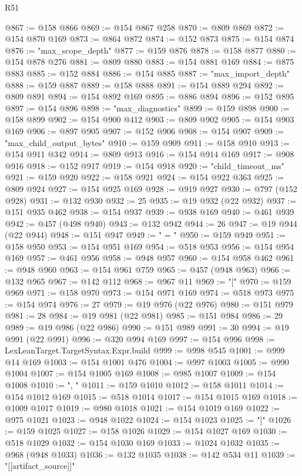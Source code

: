\begin{lexlean}{R51}
\begin{coremodule}
@867 := @158 @866
@869 := @154 @867 @258
@870 := @809 @869
@872 := @154 @870 @169
@873 := @864 @872
@874 := @152 @873
@875 := @154 @874
@876 := "max_scope_depth"
@877 := @159 @876
@878 := @158 @877
@880 := @154 @878 @276
@881 := @809 @880
@883 := @154 @881 @169
@884 := @875 @883
@885 := @152 @884
@886 := @154 @885
@887 := "max_import_depth"
@888 := @159 @887
@889 := @158 @888
@891 := @154 @889 @294
@892 := @809 @891
@894 := @154 @892 @169
@895 := @886 @894
@896 := @152 @895
@897 := @154 @896
@898 := "max_diagnostics"
@899 := @159 @898
@900 := @158 @899
@902 := @154 @900 @412
@903 := @809 @902
@905 := @154 @903 @169
@906 := @897 @905
@907 := @152 @906
@908 := @154 @907
@909 := "max_child_output_bytes"
@910 := @159 @909
@911 := @158 @910
@913 := @154 @911 @342
@914 := @809 @913
@916 := @154 @914 @169
@917 := @908 @916
@918 := @152 @917
@919 := @154 @918
@920 := "child_timeout_ms"
@921 := @159 @920
@922 := @158 @921
@924 := @154 @922 @363
@925 := @809 @924
@927 := @154 @925 @169
@928 := @919 @927
@930 := @797 (@152 @928)
@931 := @132 @930
@932 := 25
@935 := @19 @932 (@22 @932)
@937 := @151 @935 @462
@938 := @154 @937
@939 := @938 @169
@940 := @461 @939
@942 := @457 (@498 @940)
@943 := @132 @942
@944 := 26
@947 := @19 @944 (@22 @944)
@948 := @151 @947
@949 := " = "
@950 := @159 @949
@951 := @158 @950
@953 := @154 @951 @169
@954 := @518 @953
@956 := @154 @954 @169
@957 := @461 @956
@958 := @948 @957
@960 := @154 @958 @462
@961 := @948 @960
@963 := @154 @961 @759
@965 := @457 (@948 @963)
@966 := @132 @965
@967 := @142 @112
@968 := @967 @11
@969 := "["
@970 := @159 @969
@971 := @158 @970
@973 := @154 @971 @169
@974 := @518 @973
@975 := @154 @974
@976 := 27
@979 := @19 @976 (@22 @976)
@980 := @151 @979
@981 := 28
@984 := @19 @981 (@22 @981)
@985 := @151 @984
@986 := 29
@989 := @19 @986 (@22 @986)
@990 := @151 @989
@991 := 30
@994 := @19 @991 (@22 @991)
@996 := @320 @994 @169
@997 := @154 @996
@998 := LexLeanTarget.TargetSyntax.Expr.build
@999 := @998 @545
@1001 := @999 @14 @169
@1003 := @154 @1001 @476
@1004 := @997 @1003
@1005 := @990 @1004
@1007 := @154 @1005 @169
@1008 := @985 @1007
@1009 := @154 @1008
@1010 := ", "
@1011 := @159 @1010
@1012 := @158 @1011
@1014 := @154 @1012 @169
@1015 := @518 @1014
@1017 := @154 @1015 @169
@1018 := @1009 @1017
@1019 := @980 @1018
@1021 := @154 @1019 @169
@1022 := @975 @1021
@1023 := @948 @1022
@1024 := @154 @1023
@1025 := "]"
@1026 := @159 @1025
@1027 := @158 @1026
@1029 := @154 @1027 @169
@1030 := @518 @1029
@1032 := @154 @1030 @169
@1033 := @1024 @1032
@1035 := @968 (@948 @1033)
@1036 := @132 @1035
@1038 := @142 @534 @11
@1039 := "[[artifact_source]]"

\end{coremodule}
\end{lexlean}
